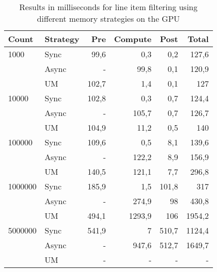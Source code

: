\documentclass[a4paper,titlepage]{article}
\begin{document}
\begin{table}
\begin{tabular}{l l r r r r}
\toprule
\textbf{Count} & \textbf{Strategy} &\textbf{Pre} & \textbf{Compute} & \textbf{Post} & \textbf{Total}\\
\midrule
1000    & Sync  &  99,6  &  0,3    & 0,2   & 127,6 \\
        & Async &  -     & 99,8    & 0,1   & 120,9 \\
        & UM    &  102,7 &  1,4    & 0,1   & 127 \\
10000   & Sync  &  102,8 &  0,3    & 0,7   & 124,4 \\
        & Async &  -     & 105,7   & 0,7   & 126,7 \\
        & UM    &  104,9 &  11,2   & 0,5   & 140 \\
100000  & Sync  &  109,6 &  0,5    & 8,1   & 139,6 \\
        & Async &  -     & 122,2   & 8,9   & 156,9 \\
        & UM    &  140,5 &  121,1  & 7,7   & 296,8 \\
1000000 & Sync  &  185,9 &  1,5    & 101,8 & 317 \\
        & Async &  -     & 274,9   & 98    & 430,8 \\
        & UM    &  494,1 &  1293,9 & 106   & 1954,2 \\
5000000 & Sync  &  541,9 &  7      & 510,7 & 1124,4 \\
        & Async &  -     & 947,6   & 512,7 & 1649,7 \\
        & UM    &  -     & -       & -     & - \\
\bottomrule
\end{tabular}
\label{tbl:line-item-strategies}
\caption{Results in milliseconds for line item filtering using different memory strategies on the GPU}
\end{table}
\end{document}
